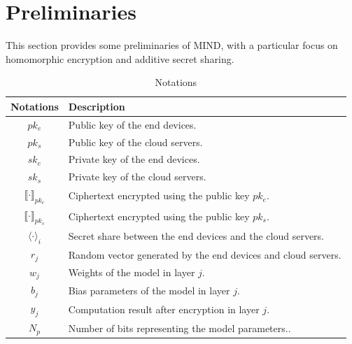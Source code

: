 \documentclass[conference]{IEEEtran}
\newcommand{\DEnc}{\texttt{DEnc}}
\newcommand{\PEnc}{\texttt{PEnc}}
\begin{document}
\section{Preliminaries}
This section provides some preliminaries of MIND, with a particular focus on homomorphic encryption and additive secret sharing.
\begin{table}[h]
\centering
\caption{Notations}
\label{table:notations}
\begin{tabular}{c | p{10cm}}
\toprule
\textbf{Notations} & \textbf{Description} \\ 
\midrule
$pk_e$                                   & Public key of the end devices. \\
$pk_s$                                   & Public key of the cloud servers. \\
$sk_e$                                   & Private key of the end devices. \\
$sk_s$                                   & Private key of the cloud servers. \\
$\llbracket \cdot \rrbracket_{pk_e}$     & Ciphertext encrypted using the public key $pk_e$. \\
$\llbracket \cdot \rrbracket_{pk_s}$     & Ciphertext encrypted using the public key $pk_s$. \\
$\langle \cdot \rangle_i$                & Secret share between the end devices and the cloud servers. \\
$r_j$                                    & Random vector generated by the end devices and cloud servers. \\
$w_j$                                      & Weights of the model in layer $j$. \\
$b_j$                                      & Bias parameters of the model in layer $j$. \\
$y_j$                                    & Computation result after encryption in layer $j$.\\
$N_{p}$          & Number of bits representing the model parameters..\\

\end{tabular}
\end{table}
\end{document}
